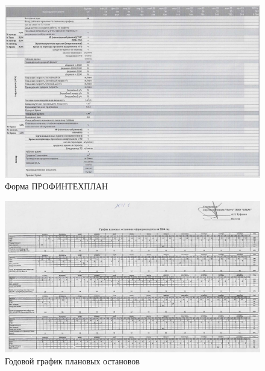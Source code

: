 % 
\begin{figure}
\begin{center}
\includegraphics[height=0.6\textheight, width=1.3\textwidth, angle=90, keepaspectratio]{Pics/XI.1.jpg}
\end{center}
\caption{Форма ПРОФИНТЕХПЛАН}
\label{pic:XI.1}
\end{figure}
\clearpage

\begin{figure}
\begin{center}
\includegraphics[height=0.6\textheight, width=1.3\textwidth, angle=90, keepaspectratio]{Pics/XII.1.jpg}
\end{center}
\caption{Годовой график плановых остановов}
\label{pic:XII.1.jpg}
\end{figure}
\clearpage

